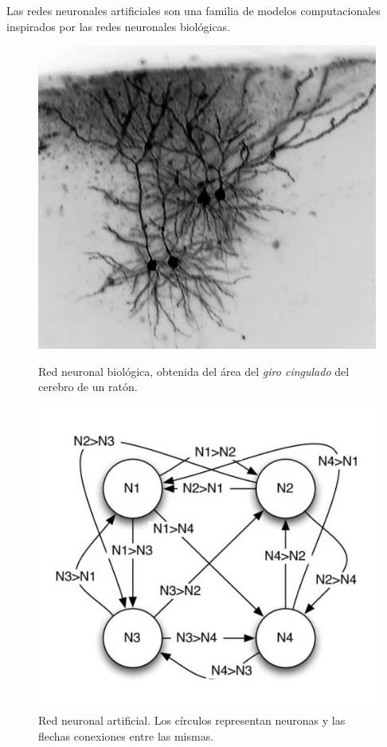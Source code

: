 Las redes neuronales artificiales son una familia de modelos computacionales inspirados por las redes neuronales biológicas.


\begin{figure}[ht]
\centering
\begin{minipage}[b]{0.40\linewidth}
\centering
\includegraphics[width=\textwidth]{img/neuronales/biological_mouse}
\caption{Red neuronal biológica, obtenida del área del \textit{giro cingulado} del cerebro de un ratón.}
\label{fig:biological}
\end{minipage}
\hspace{0.5cm}
\begin{minipage}[b]{0.40\linewidth}
\centering
\includegraphics[width=\textwidth]{img/neuronales/artificial}
\caption{Red neuronal artificial. Los círculos representan neuronas y las flechas conexiones entre las mismas.}
\label{fig:artificial}
\end{minipage}
\end{figure}


